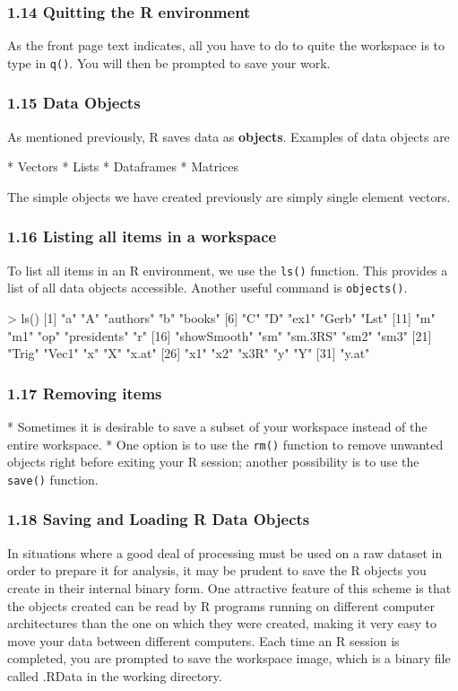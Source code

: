  
 
 \frametitle{1.14 Quitting the R environment}
 As the front page text indicates, all you have to do to quite the workspace is to type in \texttt{q()}.
 You will then be prompted to save your work.
 
 
 \frametitle{1.15 Data Objects}
 As mentioned previously, R saves data as \textbf{objects}. Examples of data objects are
 
*  Vectors
*  Lists
*  Dataframes
*  Matrices

 The simple objects we have created previously are simply single element vectors.
 
 
 \frametitle{1.16 Listing all items in a workspace}
 To list all items in an R environment, we use the \texttt{ls()} function. This provides a list of all data
 objects accessible. Another useful command is \texttt{objects()}.
 \begin{framed}
 \begin{semiverbatim}
 > ls()
 [1] "a" "A" "authors" "b" "books"
 [6] "C" "D" "ex1" "Gerb" "Lst"
 [11] "m" "m1" "op" "presidents" "r"
 [16] "showSmooth" "sm" "sm.3RS" "sm2" "sm3"
 [21] "Trig" "Vec1" "x" "X" "x.at"
 [26] "x1" "x2" "x3R" "y" "Y"
 [31] "y.at"
 \end{semiverbatim}
 \end{framed}
 
 
 \frametitle{1.17 Removing items}
 
*  Sometimes it is desirable to save a subset of your workspace instead of the entire workspace.
*  One option is to use the \texttt{rm()} function to remove unwanted objects right before exiting your R
 session; another possibility is to use the \texttt{save()} function.

 
 
 \frametitle{1.18 Saving and Loading R Data Objects}
 In situations where a good deal of processing must be used on a raw dataset in order to prepare
 it for analysis, it may be prudent to save the R objects you create in their internal binary form.
 One attractive feature of this scheme is that the objects created can be read by R programs
 running on different computer architectures than the one on which they were created, making it
 very easy to move your data between different computers. Each time an R session is completed,
 you are prompted to save the workspace image, which is a binary file called .RData in the
 working directory.
 
